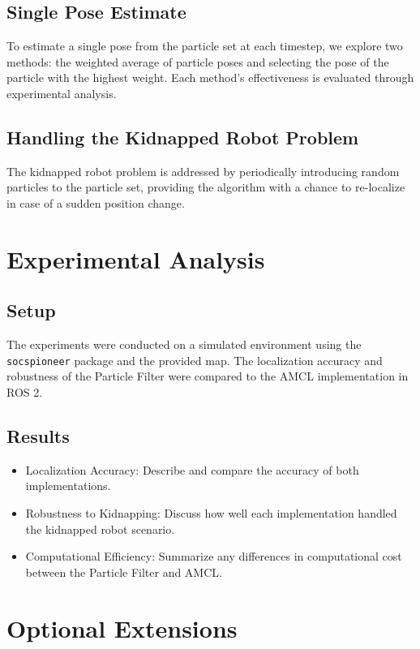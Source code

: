 \documentclass[11pt]{article}
\begin{document}
\subsection{Single Pose Estimate}
To estimate a single pose from the particle set at each timestep, we explore two methods: the weighted average of particle poses and selecting the pose of the particle with the highest weight. Each method's effectiveness is evaluated through experimental analysis.

\subsection{Handling the Kidnapped Robot Problem}
The kidnapped robot problem is addressed by periodically introducing random particles to the particle set, providing the algorithm with a chance to re-localize in case of a sudden position change.

\section{Experimental Analysis}

\subsection{Setup}
The experiments were conducted on a simulated environment using the \texttt{socspioneer} package and the provided map. The localization accuracy and robustness of the Particle Filter were compared to the AMCL implementation in ROS 2.

\subsection{Results}
\begin{itemize}
    \item Localization Accuracy: Describe and compare the accuracy of both implementations.
    \item Robustness to Kidnapping: Discuss how well each implementation handled the kidnapped robot scenario.
    \item Computational Efficiency: Summarize any differences in computational cost between the Particle Filter and AMCL.
\end{itemize}

\section{Optional Extensions}
\end{document}
